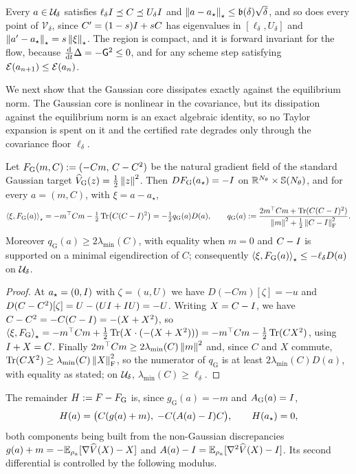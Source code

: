 Every $a\in\mathcal{U}_\delta$ satisfies $\ell_\delta I\preceq C\preceq U_\delta I$ and
$\left\lVert a-a_\star\right\rVert_\star\leq\mathfrak b(\delta)\sqrt\delta$, and so does every point of
$\mathcal V_\delta$, since $C'=(1-s)I+sC$ has eigenvalues in $[\ell_\delta,U_\delta]$ and
$\left\lVert a'-a_\star\right\rVert_\star=s\left\lVert \xi\right\rVert_\star$. The region is compact, and it is forward invariant
for the flow, because $\tfrac{\mathrm{d}}{\mathrm{d} t}\Delta=-\mathsf{G}^2\leq0$, and for any scheme step
satisfying $\mathcal{E}(a_{n+1})\leq\mathcal{E}(a_n)$.

We next show that the Gaussian core dissipates exactly against the equilibrium norm. The Gaussian core is nonlinear in the covariance,
but its dissipation against the equilibrium norm is an exact algebraic identity, so no Taylor
expansion is spent on it and the certified rate degrades only through the covariance floor
$\ell_\delta$.

\begin{lemma}
\label{lem:gauss-core}
Let $F_{\mathrm G}(m,C):=(-Cm,\,C-C^2)$ be the natural gradient field of the standard Gaussian target
$\widehat V_{\mathrm G}(z)=\tfrac12\left\lVert z\right\rVert^2$. Then $DF_{\mathrm G}(a_\star)=-I$ on
$\mathbb{R}^{N_\theta}\times\mathbb{S}(N_\theta)$, and for every $a=(m,C)$, with $\xi=a-a_\star$,
\[
    \left\langle \xi,F_{\mathrm G}(a)\right\rangle_\star
    =-m^\top Cm-\tfrac12\operatorname{Tr}\bigl(C(C-I)^2\bigr)
    =-\tfrac12q_{\mathrm G}(a)D(a),
    \qquad
    q_{\mathrm G}(a):=\frac{2m^\top Cm+\operatorname{Tr}(C(C-I)^2)}{\left\lVert m\right\rVert^2+\tfrac12\left\lVert C-I\right\rVert_{\mathrm{F}}^2}.
\]
Moreover $q_{\mathrm G}(a)\geq2\lambda_{\min}(C)$, with equality when $m=0$ and $C-I$ is
supported on a minimal eigendirection of $C$; consequently
$\left\langle \xi,F_{\mathrm G}(a)\right\rangle_\star\leq-\ell_\delta D(a)$ on $\mathcal{U}_\delta$.
\end{lemma}

\begin{proof}
At $a_\star=(0,I)$ with $\zeta=(u,U)$ we have $D(-Cm)[\zeta]=-u$ and
$D(C-C^2)[\zeta]=U-(UI+I U)=-U$. Writing $X=C-I$, we have
$C-C^2=-C(C-I)=-(X+X^2)$, so
$\left\langle \xi,F_{\mathrm G}\right\rangle_\star=-m^\top Cm+\tfrac12\operatorname{Tr}(X\cdot(-(X+X^2)))=-m^\top Cm-\tfrac12\operatorname{Tr}(CX^2)$,
using $I+X=C$. Finally $2m^\top Cm\geq2\lambda_{\min}(C)\left\lVert m\right\rVert^2$ and, since $C$ and $X$
commute, $\operatorname{Tr}(CX^2)\geq\lambda_{\min}(C)\left\lVert X\right\rVert_{\mathrm{F}}^2$, so the numerator of
$q_{\mathrm G}$ is at least $2\lambda_{\min}(C)D(a)$, with equality as stated; on
$\mathcal{U}_\delta$, $\lambda_{\min}(C)\geq\ell_\delta$.
\end{proof}

The remainder $H:=F-F_{\mathrm G}$ is, since $g_{\mathrm G}(a)=-m$ and $A_{\mathrm G}(a)=I$,
\begin{equation}
\label{eq:H-def}
    H(a)=\bigl(C(g(a)+m),\;-C(A(a)-I)C\bigr),
    \qquad H(a_\star)=0,
\end{equation}
both components being built from the non-Gaussian discrepancies
$g(a)+m=-\mathbb{E}_{\rho_a}[\nabla\widehat V(X)-X]$ and $A(a)-I=\mathbb{E}_{\rho_a}[\nabla^2\widehat V(X)-I]$.
Its second differential is controlled by the following modulus.

